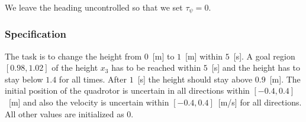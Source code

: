 \documentclass[EPiC]{easychair}
\begin{document}
We leave the heading uncontrolled so that we set $\tau_\psi = 0$.

\subsubsection{Specification}
The task is to change the height from $0$~[m] to $1$~[m] within $5$~[s]. A goal region $[0.98,1.02]$ of the height $x_3$ has to be reached within $5$~[s] and the height has to stay below $1.4$ for all times. After $1$~[s] the height should stay above $0.9$~[m]. The initial position of the quadrotor is uncertain in all directions within $[-0.4,0.4]$~[m] and also the velocity is uncertain within $[-0.4,0.4]$~[m/s] for all directions. All other values are initialized as $0$.


\end{document}
